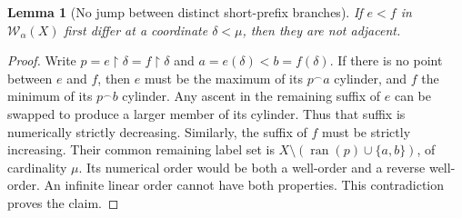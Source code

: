 \documentclass[11pt]{article}
\newtheorem{lemma}[lemma]{Lemma}
\theoremstyle{definition}
\theoremstyle{remark}
\newcommand{\WO}{\mathcal W}
\newcommand{\ran}{\operatorname{ran}}
\newcommand{\cat}{\mathbin{{}^\frown}}
\newcommand{\res}{\mathbin{\upharpoonright}}
\begin{document}
\begin{lemma}[No jump between distinct short-prefix branches]\label{swo:ds:lem:nojump}
If $e<f$ in $\WO_\alpha(X)$ first differ at a coordinate
$\delta<\mu$, then they are not adjacent.
\end{lemma}
\begin{proof}
Write $p=e\res\delta=f\res\delta$ and $a=e(\delta)<b=f(\delta)$.
If there is no point between $e$ and $f$, then $e$ must be the maximum of
its $p\cat a$ cylinder, and $f$ the minimum of its $p\cat b$ cylinder.
Any ascent in the remaining suffix of $e$ can be swapped to produce a
larger member of its cylinder. Thus that suffix is numerically strictly
decreasing. Similarly, the suffix of $f$ must be strictly increasing.
Their common remaining label set is
$X\setminus(\ran(p)\cup\{a,b\})$, of cardinality $\mu$. Its numerical
order would be both a well-order and a reverse well-order. An infinite
linear order cannot have both properties. This contradiction proves the
claim.
\end{proof}
\end{document}
